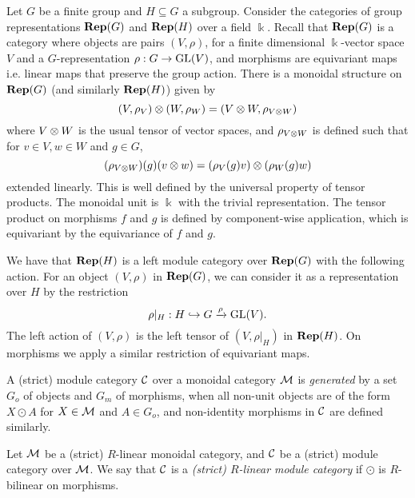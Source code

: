 \begin{example}
    Let $G$ be a finite group and $H \subseteq G$ a subgroup. Consider the categories of group representations $\operatorname{\mathbf{Rep}}(G)$ and $\operatorname{\mathbf{Rep}}(H)$ over a field $\Bbbk$. Recall that $\operatorname{\mathbf{Rep}}(G)$ is a category where objects are pairs $(V, \rho)$, for a finite dimensional $\Bbbk$-vector space $V$ and a $G$-representation $\rho: G \to \operatorname{GL}(V)$, and morphisms are equivariant maps i.e. linear maps that preserve the group action. There is a monoidal structure on $\operatorname{\mathbf{Rep}}(G)$ (and similarly $\operatorname{\mathbf{Rep}}(H)$) given by
    \[
        (V, \rho_V) \otimes (W, \rho_W) = (V \otimes W, \rho_{V \otimes W})
    \]
    where $V \otimes W$ is the usual tensor of vector spaces, and $\rho_{V \otimes W}$ is defined such that for $v \in V, w \in W$ and $g \in G$,
    \[
        (\rho_{V \otimes W})(g)(v \otimes w) = (\rho_V(g) v) \otimes (\rho_W(g) w)
    \]
    extended linearly. This is well defined by the universal property of tensor products. The monoidal unit is $\Bbbk$ with the trivial representation. The tensor product on morphisms $f$ and $g$ is defined by component-wise application, which is equivariant by the equivariance of $f$ and $g$.

    We have that $\operatorname{\mathbf{Rep}}(H)$ is a left module category over $\operatorname{\mathbf{Rep}}(G)$ with the following action. For an object $(V,\rho)$ in $\operatorname{\mathbf{Rep}}(G)$, we can consider it as a representation over $H$ by the restriction
    \[
        \rho|_H: H \hookrightarrow G \xrightarrow{\rho} \operatorname{GL}(V).
    \]
    The left action of $(V, \rho)$ is the left tensor of $(V,\rho|_H)$ in $\operatorname{\mathbf{Rep}}(H)$. On morphisms we apply a similar restriction of equivariant maps.
\end{example}

\begin{definition}
    A (strict) module category $\mathcal{C}$ over a monoidal category $\mathcal{M}$ is \textit{generated} by a set $G_o$ of objects and $G_m$ of morphisms, when all non-unit objects are of the form $X \odot A$ for $X \in \mathcal{M}$ and $A \in G_o$, and non-identity morphisms in $\mathcal{C}$ are defined similarly.
\end{definition}

\begin{definition}
    Let $\mathcal{M}$ be a (strict) $R$-linear monoidal category, and $\mathcal{C}$ be a (strict) module category over $\mathcal{M}$. We say that $\mathcal{C}$ is a \textit{(strict) $R$-linear module category} if $\odot$ is $R$-bilinear on morphisms.
\end{definition}

